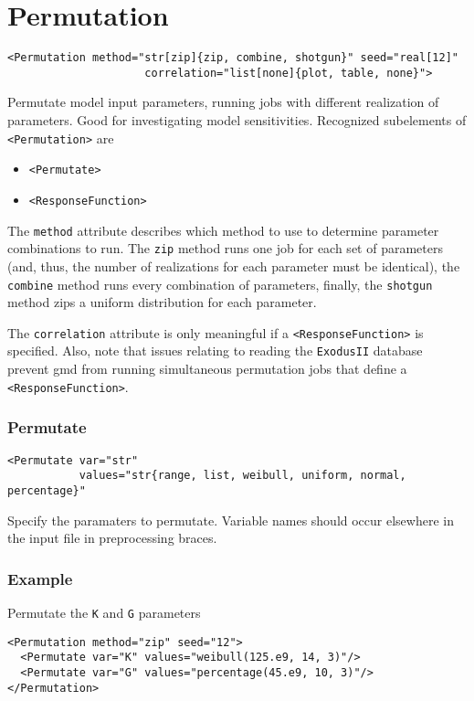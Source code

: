 \documentclass[11pt]{report}
\newcommand{\exodusii}{{\sc\texttt{ExodusII}}}
\renewcommand{\tag}[1]{\texttt{<#1>}}
\begin{document}
\chapter{Permutation}
\begin{verbatim}
<Permutation method="str[zip]{zip, combine, shotgun}" seed="real[12]"
                     correlation="list[none]{plot, table, none}">
\end{verbatim}
%
Permutate model input parameters, running jobs with different realization of
parameters. Good for investigating model sensitivities. Recognized subelements
of \tag{Permutation} are

\begin{itemize}
  \item \tag{Permutate}
  \item \tag{ResponseFunction}
\end{itemize}

The \texttt{method} attribute describes which method to use to determine
parameter combinations to run.  The \texttt{zip} method runs one job for each
set of parameters (and, thus, the number of realizations for each parameter
must be identical), the \texttt{combine} method runs every combination of
parameters, finally, the \texttt{shotgun} method zips a uniform distribution
for each parameter.

The \texttt{correlation} attribute is only meaningful if a
\tag{ResponseFunction} is specified.  Also, note that issues relating to
reading the \exodusii{} database prevent gmd from running simultaneous
permutation jobs that define a \tag{ResponseFunction}.


\subsection{Permutate}
\begin{verbatim}
<Permutate var="str"
           values="str{range, list, weibull, uniform, normal, percentage}"
\end{verbatim}
%
Specify the paramaters to permutate. Variable names should occur elsewhere in
the input file in preprocessing braces.

\subsection{Example}
Permutate the \texttt{K} and \texttt{G} parameters
%
\begin{verbatim}
<Permutation method="zip" seed="12">
  <Permutate var="K" values="weibull(125.e9, 14, 3)"/>
  <Permutate var="G" values="percentage(45.e9, 10, 3)"/>
</Permutation>
\end{verbatim}
\end{document}
